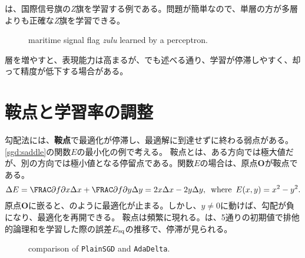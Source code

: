 \documentclass[10pt,a4paper]{book}
\begin{document}
は、国際信号旗の\textit{Z}旗を学習する例である。問題が簡単なので、単層の方が多層よりも正確な\textit{Z}旗を学習できる。

\begin{figure}[h]
\centering
{}
\caption{maritime signal flag \textit{zulu} learned by a perceptron.\label{fig:mcp.zflag}}
\end{figure}

層を増やすと、表現能力は高まるが、でも述べる通り、学習が停滞しやすく、却って精度が低下する場合がある。

\section{鞍点と学習率の調整\label{sect:nn.sgd}}

勾配法には、\textbf{鞍点}で最適化が停滞し、最適解に到達せずに終わる弱点がある。\eqref{sgd:saddle}の関数$E$の最小化の例で考える。
鞍点とは、ある方向では極大値だが、別の方向では極小値となる停留点である。関数$E$の場合は、原点$\bm{O}$が鞍点である。
%
\begin{equation}
\label{eq:sgd:saddle}
\Delta E = \pdiff{f}{x} \Delta x + \pdiff{f}{y} \Delta y = 2x \Delta x - 2y \Delta y,
\where
E(x,y) = x^2 - y^2.
\end{equation}
%
原点$\bm{O}$に嵌ると、のように最適化が止まる。しかし、$y\neq0$に動けば、勾配が負になり、最適化を再開できる。
鞍点は頻繁に現れる。は、5通りの初期値で排他的論理和を学習した際の誤差$E_\mathrm{sq}$の推移で、停滞が見られる。

\begin{figure}[h]
\centering
{}
\caption{comparison of \texttt{PlainSGD} and \texttt{AdaDelta}.\label{fig:sgd}}
\end{figure}
\end{document}
